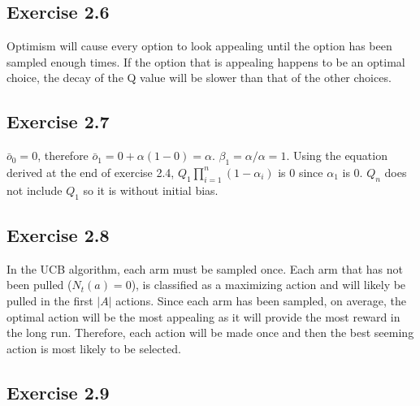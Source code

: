 \subsection{Exercise 2.6}
Optimism will cause every option to look appealing until the option has been sampled enough times. If the option that is appealing happens to be an optimal choice, the decay of the Q value will be slower than that of the other choices.

\subsection{Exercise 2.7}
$\bar{o}_0 = 0$, therefore $\bar{o}_1 = 0 + \alpha(1-0) = \alpha$. $\beta_1 = \alpha/\alpha = 1$. Using the equation derived at the end of exercise 2.4,  $Q_1\prod\limits_{i=1}^n(1-\alpha_i)$ is 0 since $\alpha_1$ is 0. $Q_n$ does not include $Q_1$ so it is without initial bias.

\subsection{Exercise 2.8}
In the UCB algorithm, each arm must be sampled once. Each arm that has not been pulled ($N_t(a) = 0$), is classified as a maximizing action and will likely be pulled in the first $|A|$ actions. Since each arm has been sampled, on average, the optimal action will be the most appealing as it will provide the most reward in the long run. Therefore, each action will be made once and then the best seeming action is most likely to be selected.

\subsection{Exercise 2.9}